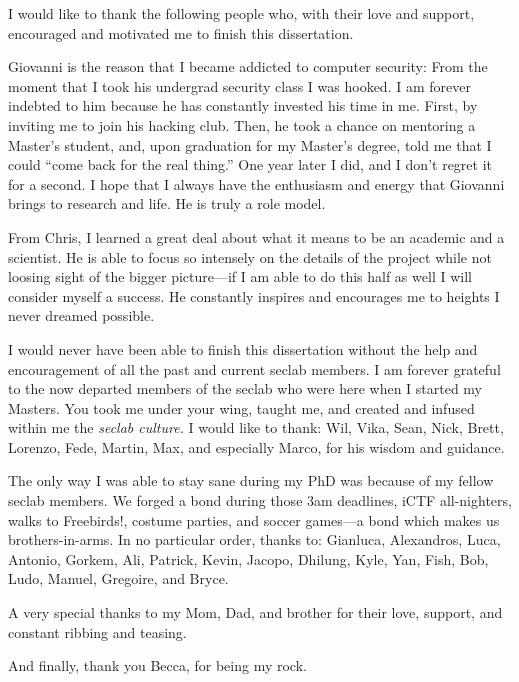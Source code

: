 \begin{acknowledgements}

I would like to thank the following people who, with their love and
support, encouraged and motivated me to finish this dissertation.

Giovanni is the reason that I became addicted to computer security:
From the moment that I took his undergrad security class I was hooked.
I am forever indebted to him because he has constantly invested his
time in me. First, by inviting me to join his hacking club. Then, he
took a chance on mentoring a Master's student, and, upon graduation
for my Master's degree, told me that I could ``come back for the real
thing.'' One year later I did, and I don't regret it for a second. I
hope that I always have the enthusiasm and energy that Giovanni brings
to research and life. He is truly a role model.

From Chris, I learned a great deal about what it means to be an
academic and a scientist. He is able to focus so intensely on the
details of the project while not loosing sight of the bigger
picture---if I am able to do this half as well I will consider myself
a success. He constantly inspires and encourages me to heights I never
dreamed possible.

I would never have been able to finish this dissertation without the
help and encouragement of all the past and current seclab members. I
am forever grateful to the now departed members of the seclab who were
here when I started my Masters. You took me under your wing, taught
me, and created and infused within me the \emph{seclab culture.} I
would like to thank: Wil, Vika, Sean, Nick, Brett, Lorenzo, Fede,
Martin, Max, and especially Marco, for his wisdom and guidance.

The only way I was able to stay sane during my PhD was because of my
fellow sec\-lab members. We forged a bond during those 3am deadlines,
iCTF all-nighters, walks to Freebirds!, costume parties, and soccer
games---a bond which makes us brothers-in-arms. In no particular
order, thanks to: Gianluca, Alexandros, Luca, Antonio, Gorkem, Ali,
Patrick, Kevin, Jacopo, Dhilung, Kyle, Yan, Fish, Bob, Ludo, Manuel,
Gregoire, and Bryce.

A very special thanks to my Mom, Dad, and brother for their love,
support, and constant ribbing and teasing.

And finally, thank you Becca, for being my rock.

\end{acknowledgements}
